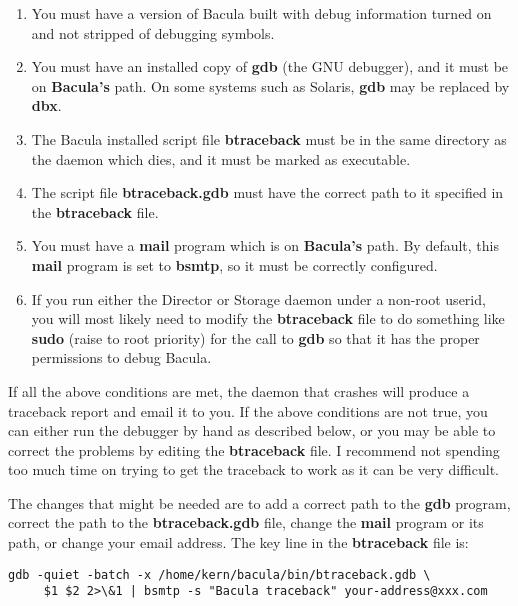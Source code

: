 \begin{enumerate}
\item You must have a version of Bacula built with debug information turned
   on and not stripped of debugging symbols.

\item You must have an installed copy of {\bf gdb} (the GNU debugger),  and it
   must be on {\bf Bacula's} path. On some systems such as Solaris, {\bf
   gdb} may be replaced by {\bf dbx}.

\item The Bacula installed script file {\bf btraceback} must  be in the same
   directory as the daemon which dies, and it must  be marked as executable.

\item The script file {\bf btraceback.gdb} must  have the correct  path to it
   specified in the {\bf btraceback} file.

\item You must have a {\bf mail} program which is on {\bf Bacula's}  path.
   By default, this {\bf mail} program is set to {\bf bsmtp}, so it must
   be correctly configured.

\item If you run either the Director or Storage daemon under a non-root
   userid, you will most likely need to modify the {\bf btraceback} file
   to do something like {\bf sudo} (raise to root priority) for the
   call to {\bf gdb} so that it has the proper permissions to debug
   Bacula.
\end{enumerate}

If all the above conditions are met, the daemon that crashes will produce a
traceback report and email it to you. If the above conditions are not true,
you can either run the debugger by hand as described below, or you may be able
to correct the problems by editing the {\bf btraceback} file. I recommend not
spending too much time on trying to get the traceback to work as it can be
very difficult.

The changes that might be needed are to add a correct path to the {\bf gdb}
program, correct the path to the {\bf btraceback.gdb} file, change the {\bf
mail} program or its path, or change your email address. The key line in the
{\bf btraceback} file is:

\footnotesize
\begin{verbatim}
gdb -quiet -batch -x /home/kern/bacula/bin/btraceback.gdb \
     $1 $2 2>\&1 | bsmtp -s "Bacula traceback" your-address@xxx.com
\end{verbatim}
\normalsize

